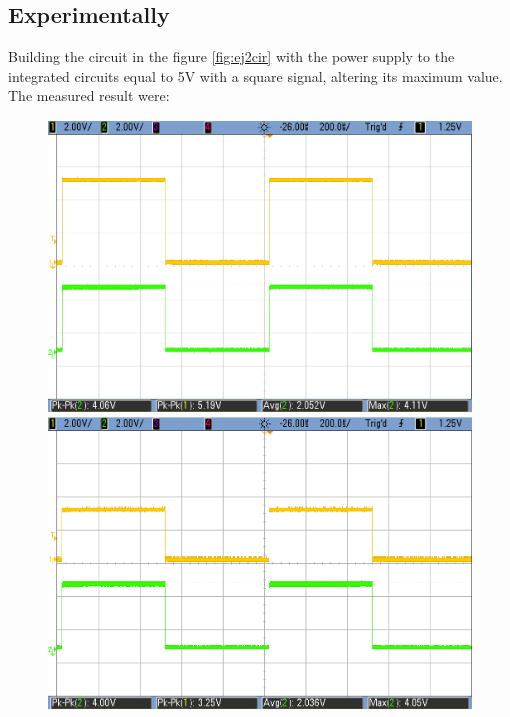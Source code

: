 	\subsection{\color{purple}Experimentally}
	
	Building the circuit in the figure \ref{fig:ej2cir} with the power supply to the integrated circuits equal to 5V with a square signal, altering its maximum value. The measured result were:
	
	\begin{figure}[h!]
        \centering
        \includegraphics[scale=0.2]{HC-LS-5V.png}\hspace{1cm}
        \includegraphics[scale=0.2]{HC-LS-3V.png}\\
		\vspace{0.2cm}
		\hspace{0.9cm}

\end{figure}
